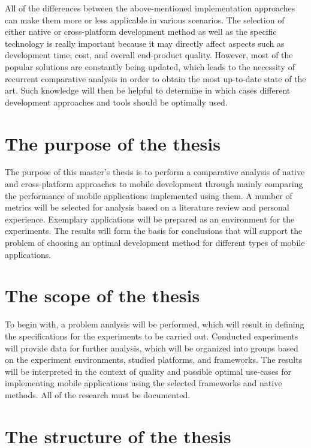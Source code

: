 All of the differences between the above-mentioned implementation approaches can make them more or less applicable in various scenarios. The selection of either native or cross-platform development method as well as the specific technology is really important because it may directly affect aspects such as development time, cost, and overall end-product quality. However, most of the popular solutions are constantly being updated, which leads to the necessity of recurrent comparative analysis in order to obtain the most up-to-date state of the art. Such knowledge will then be helpful to determine in which cases different development approaches and tools should be optimally used.

\section{The purpose of the thesis}

The purpose of this master's thesis is to perform a comparative analysis of native and cross-platform approaches to mobile development through mainly comparing the performance of mobile applications implemented using them. A number of metrics will be selected for analysis based on a literature review and personal experience. Exemplary applications will be prepared as an environment for the experiments. The results will form the basis for conclusions that will support the problem of choosing an optimal development method for different types of mobile applications.

\section{The scope of the thesis}

To begin with, a problem analysis will be performed, which will result in defining the specifications for the experiments to be carried out. Conducted experiments will provide data for further analysis, which will be organized into groups based on the experiment environments, studied platforms, and frameworks. The results will be interpreted in the context of quality and possible optimal use-cases for implementing mobile applications using the selected frameworks and native methods. All of the research must be documented.

\section{The structure of the thesis}

